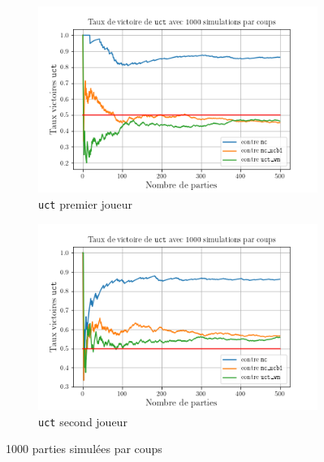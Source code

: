 \documentclass[a4paper]{article}
\theoremstyle{definition}
\begin{document}
\begin{figure}[!h]
	\centering
	\begin{subfigure}{0.49\textwidth}
		\centering
		\includegraphics[width=\textwidth]{n1000_uct_snd.png}
		\caption{\texttt{uct} premier joueur}
		\label{fig:n1000-uct-snd}
	\end{subfigure}
	\hfill
	\begin{subfigure}{0.49\textwidth}
		\centering
		\includegraphics[width=\textwidth]{n1000_uct_first.png}
		\caption{\texttt{uct} second joueur}
		\label{fig:n1000-uct-first}
	\end{subfigure}
	\caption{1000 parties simulées par coups}
	\label{fig:n1000}
\end{figure}
\end{document}
